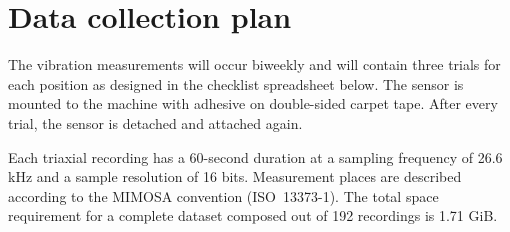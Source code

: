 \thispagestyle{empty}
\chapter{Data collection plan} \label{appendix:data-collection}
\renewcommand*{\thepage}{C-\arabic{page}}

The vibration measurements will occur biweekly and will contain three trials for each position as designed in the checklist spreadsheet below. The sensor is mounted to the machine with adhesive on double-sided carpet tape. After every trial, the sensor is detached and attached again. 

Each triaxial recording has a 60-second duration at a sampling frequency of 26.6 kHz and a sample resolution of 16 bits. Measurement places are described according to the MIMOSA convention (ISO~13373-1). The total space requirement for a complete dataset composed out of 192 recordings is 1.71 GiB.

